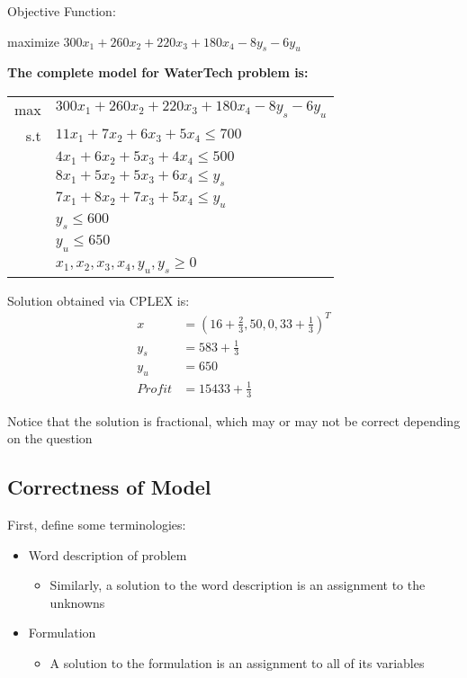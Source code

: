 \documentclass[letterpaper, 12pt]{article}
\begin{document}
    Objective Function:\\
    {\begin{center}
        maximize $300x_1 + 260x_2 + 220x_3 + 180x_4 - 8y_s - 6y_u$
    \end{center}
    \pagebreak
    
    {\large\textbf{The complete model for WaterTech problem is:}}\\
    \begin{center}
        \begin{tabular}{r l}
            max & $300x_1 + 260x_2 + 220x_3 + 180x_4 - 8y_s - 6y_u$\\
            s.t & $11x_1 + 7x_2 + 6x_3 + 5x_4 \leq 700$\\
            & $4x_1 + 6x_2 + 5x_3 + 4x_4 \leq 500$\\
            & $8x_1 + 5x_2 + 5x_3 + 6x_4 \leq y_s$\\
            & $7x_1 + 8x_2 + 7x_3 + 5x_4 \leq y_u$\\
            & $y_s \leq 600$\\
            & $y_u \leq 650$\\
            & $x_1, x_2, x_3, x_4, y_u, y_s \geq 0$\\
        \end{tabular}
    \end{center}

    Solution obtained via CPLEX is:\\
    \begin{align*}
        x &= (16 + \frac{2}{3}, 50, 0, 33 + \frac{1}{3})^T\\
        y_s &= 583 + \frac{1}{3}\\
        y_u &= 650\\
        Profit &= 15433 + \frac{1}{3}
    \end{align*}

    Notice that the solution is fractional, which may or may not be correct depending on the question\\
    \bigskip
    \subsection{Correctness of Model}
    First, define some terminologies:\\
    \begin{itemize}
        \item Word description of problem
        \begin{itemize}
            \item Similarly, a solution to the word description is an assignment to the unknowns\\
        \end{itemize}
        \item Formulation
        \begin{itemize}
            \item A solution to the formulation is an assignment to all of its variables\\
        \end{itemize}
    \end{itemize}
    
}
\end{document}
